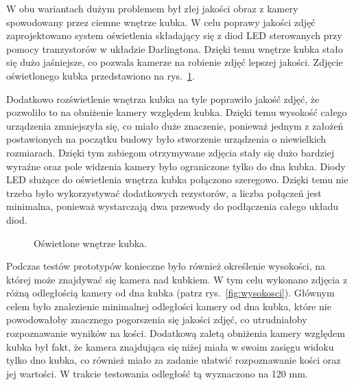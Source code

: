 W obu wariantach dużym problemem był złej jakości obraz z kamery spowodowany przez ciemne wnętrze kubka. W celu poprawy jakości zdjęć zaprojektowano 
system oświetlenia składający się z diod
LED sterowanych przy pomocy tranzystorów w układzie Darlingtona. Dzięki temu wnętrze kubka stało się dużo jaśniejsze, co pozwala kamerze na
robienie zdjęć lepszej jakości. Zdjęcie oświetlonego kubka przedstawiono na rys.~\ref{fig:jasno}. 

Dodatkowo rozświetlenie wnętrza kubka na tyle poprawiło
jakość zdjęć, że pozwoliło to na obniżenie kamery względem kubka. Dzięki temu wysokość całego urządzenia zmniejszyła się, co miało duże znaczenie, 
ponieważ jednym z założeń postawionych na początku budowy było stworzenie urządzenia o niewielkich rozmiarach.
Dzięki tym zabiegom otrzymywane zdjęcia stały się dużo bardziej wyraźne oraz pole widzenia kamery było ograniczone tylko do dna kubka.
Diody LED służące do oświetlenia wnętrza kubka połączono szeregowo. Dzięki temu nie trzeba było wykorzystywać dodatkowych rezystorów, a liczba połączeń
jest minimalna, ponieważ wystarczają dwa przewody do podłączenia całego układu diod.

\begin{figure}[H]
    \centering
    \caption{\label{fig:jasno}Oświetlone wnętrze kubka.}
\end{figure}

Podczas testów prototypów konieczne było również określenie wysokości, na której może znajdywać się kamera nad kubkiem. 
W tym celu wykonano zdjęcia z różną odległością kamery od dna kubka (patrz rys.~\ref{fig:wysokosci}). Głównym celem było znalezienie minimalnej odległości kamery od dna kubka, które nie powodowałoby 
znacznego pogorszenia się jakości zdjęć, co utrudniałoby rozpoznawanie wyników na kości. Dodatkową zaletą obniżenia kamery względem kubka był fakt, że kamera
znajdująca się niżej miała w swoim zasięgu widoku tylko dno kubka, co również miało za zadanie ułatwić rozpoznawanie kości oraz jej wartości. W trakcie testowania
odległość tą wyznaczono na 120 mm.

